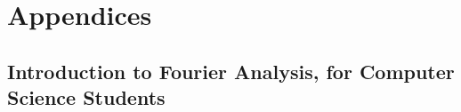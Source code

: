 \documentclass{book}
\newcommand{\LoadSection}[1]{{}}
\newcommand{\LoadAppendix}[1]{{}}
\begin{document}
    \LoadSection{standard-implementations/javascript/intro}
    \newpage
    \LoadSection{standard-implementations/javascript/max-heap-implementation}
    \newpage
    \LoadSection{standard-implementations/python}

\appendix
\chapter{Appendices}

\section{Introduction to Fourier Analysis, for Computer Science Students}
\label{sec:appendix--fourier}

    \LoadAppendix{intro-to-fourier-analysis/background}

%
\end{document}
